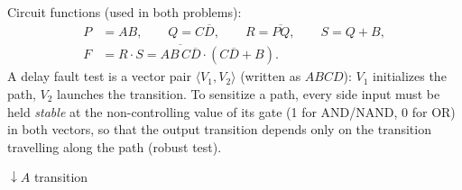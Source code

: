 \documentclass[a4paper, 10pt]{article}
\begin{document}
\begin{center}
\end{center}

\noindent Circuit functions (used in both problems):
\begin{align*}
	P & = AB, \qquad Q = C\overline{D}, \qquad R = \overline{PQ}, \qquad S = Q + B,   \\
	F & = R\cdot S = \overline{AB\,C\overline{D}}\cdot\left(C\overline{D} + B\right).
\end{align*}
A delay fault test is a vector pair \( \langle V_1, V_2 \rangle \) (written as \( ABCD \)):
\( V_1 \) initializes the path, \( V_2 \) launches the transition. To sensitize a path, every
side input must be held \emph{stable} at the non-controlling value of its gate
(1 for AND/NAND, 0 for OR) in both vectors, so that the output transition depends only on the
transition travelling along the path (robust test).

\begin{problem}
\( \downarrow A \) transition
\end{problem}
\end{document}
